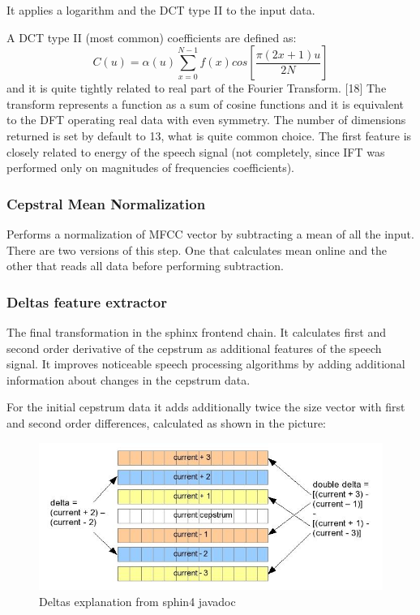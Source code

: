 \documentclass[12pt,a4paper,english]{article}
\begin{document}
It applies a logarithm and the DCT type II to the input data.  \newline

A DCT type II (most common) coefficients are defined as: 
\begin{equation}
    C(u) = \alpha(u)\sum_{x=0}^{N-1} f(x)cos[\frac{\pi(2x+1)u}{2N}] 
\end{equation}
and it is quite tightly related to real part of the Fourier Transform. [18]
The transform represents a function as a sum of cosine functions and it is equivalent to the DFT operating
real data with even symmetry. \newline
The number of dimensions returned is set by default to 13, what is quite common choice. The first feature is closely related
to energy of the speech signal (not completely, since IFT was performed only on magnitudes of frequencies coefficients).

\subsubsection{Cepstral Mean Normalization}

Performs a normalization of MFCC vector by subtracting a mean of all the input. There are two versions
of this step. One that calculates mean online and the other that reads all data before performing
subtraction.

\subsubsection{Deltas feature extractor}

The final transformation in the sphinx frontend chain. It calculates first and second order derivative of the
cepstrum as additional features of the speech signal. It improves noticeable speech processing algorithms
by adding additional information about changes in the cepstrum data. \newline

For the initial cepstrum data it adds additionally twice the size vector with first and second order
differences, calculated as shown in the picture:
\begin{figure}[hb]
    \centering
    \includegraphics[scale=0.6]{deltas_calc.jpg}
    \caption[]{Deltas explanation from sphin4 javadoc}
\end{figure}
\end{document}
